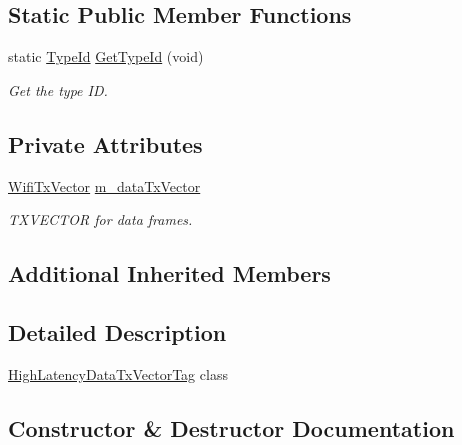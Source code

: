 \subsection*{Static Public Member Functions}
\begin{DoxyCompactItemize}
\item 
static \hyperlink{classns3_1_1TypeId}{Type\+Id} \hyperlink{classns3_1_1HighLatencyDataTxVectorTag_a1c1a43da6416de984ba3f6602a7149e5}{Get\+Type\+Id} (void)
\begin{DoxyCompactList}\small\item\em Get the type ID. \end{DoxyCompactList}\end{DoxyCompactItemize}
\subsection*{Private Attributes}
\begin{DoxyCompactItemize}
\item 
\hyperlink{classns3_1_1WifiTxVector}{Wifi\+Tx\+Vector} \hyperlink{classns3_1_1HighLatencyDataTxVectorTag_a3a0d5d34273f75f2004053db60492bc7}{m\+\_\+data\+Tx\+Vector}
\begin{DoxyCompactList}\small\item\em T\+X\+V\+E\+C\+T\+OR for data frames. \end{DoxyCompactList}\end{DoxyCompactItemize}
\subsection*{Additional Inherited Members}


\subsection{Detailed Description}
\hyperlink{classns3_1_1HighLatencyDataTxVectorTag}{High\+Latency\+Data\+Tx\+Vector\+Tag} class 

\subsection{Constructor \& Destructor Documentation}
